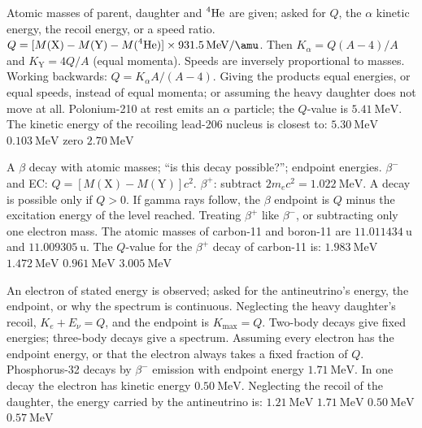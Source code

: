 {Atomic masses of parent, daughter and $\prescript{4}{}{\mathrm{He}}$ are given; asked for $Q$, the $\alpha$ kinetic energy, the
recoil energy, or a speed ratio.}
{$Q=[M(\mathrm{X})-M(\mathrm{Y})-M(\iso4{He})]\times\SI{931.5}{\MeV}/\si{\amu}$. Then $K_\alpha=Q(A-4)/A$ and
$K_{\mathrm{Y}}=4Q/A$ (equal momenta). Speeds are inversely proportional to masses. Working backwards:
$Q=K_\alpha A/(A-4)$.}
{Giving the products equal energies, or equal speeds, instead of equal momenta; or assuming the heavy
daughter does not move at all.}
{Polonium-210 at rest emits an $\alpha$ particle; the $Q$-value is $\SI{5.41}{\MeV}$. The kinetic energy of
the recoiling lead-206 nucleus is closest to:}
{$\SI{5.30}{\MeV}$}
{$\SI{0.103}{\MeV}$}
{zero}
{$\SI{2.70}{\MeV}$}

{A $\beta$ decay with atomic masses; ``is this decay possible?''; endpoint energies.}
{$\beta^-$ and EC: $Q=[M(\mathrm{X})-M(\mathrm{Y})]c^2$. $\beta^+$: subtract $2m_ec^2=\SI{1.022}{\MeV}$. A
decay is possible only if $Q>0$. If gamma rays follow, the $\beta$ endpoint is $Q$ minus the excitation
energy of the level reached.}
{Treating $\beta^+$ like $\beta^-$, or subtracting only one electron mass.}
{The atomic masses of carbon-11 and boron-11 are $\SI{11.011434}{\amu}$ and $\SI{11.009305}{\amu}$. The
$Q$-value for the $\beta^+$ decay of carbon-11 is:}
{$\SI{1.983}{\MeV}$}
{$\SI{1.472}{\MeV}$}
{$\SI{0.961}{\MeV}$}
{$\SI{3.005}{\MeV}$}

{An electron of stated energy is observed; asked for the antineutrino's energy, the endpoint, or why the
spectrum is continuous.}
{Neglecting the heavy daughter's recoil, $K_e+E_\nu=Q$, and the endpoint is $K_{\max}=Q$. Two-body decays
give fixed energies; three-body decays give a spectrum.}
{Assuming every electron has the endpoint energy, or that the electron always takes a fixed fraction of
$Q$.}
{Phosphorus-32 decays by $\beta^-$ emission with endpoint energy $\SI{1.71}{\MeV}$. In one decay the electron
has kinetic energy $\SI{0.50}{\MeV}$. Neglecting the recoil of the daughter, the energy carried by the
antineutrino is:}
{$\SI{1.21}{\MeV}$}
{$\SI{1.71}{\MeV}$}
{$\SI{0.50}{\MeV}$}
{$\SI{0.57}{\MeV}$}

